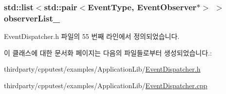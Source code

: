 \subsubsection[{\texorpdfstring{observer\+List\+\_\+}{observerList_}}]{\setlength{\rightskip}{0pt plus 5cm}std\+::list$<$std\+::pair$<${\bf Event\+Type}, {\bf Event\+Observer}$\ast$$>$ $>$ observer\+List\+\_\+\hspace{0.3cm}{\ttfamily [private]}}\hypertarget{class_event_dispatcher_af24674678ad75412a8700583deef8f8d}{}\label{class_event_dispatcher_af24674678ad75412a8700583deef8f8d}


Event\+Dispatcher.\+h 파일의 55 번째 라인에서 정의되었습니다.



이 클래스에 대한 문서화 페이지는 다음의 파일들로부터 생성되었습니다.\+:\begin{DoxyCompactItemize}
\item 
thirdparty/cpputest/examples/\+Application\+Lib/\hyperlink{_event_dispatcher_8h}{Event\+Dispatcher.\+h}\item 
thirdparty/cpputest/examples/\+Application\+Lib/\hyperlink{_event_dispatcher_8cpp}{Event\+Dispatcher.\+cpp}\end{DoxyCompactItemize}

